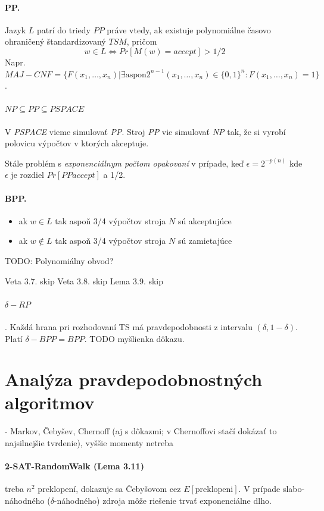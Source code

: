 \documentclass[12pt,a4paper]{article}
\begin{document}
\paragraph{PP.} Jazyk $L$ patrí do triedy $PP$ práve vtedy, ak existuje polynomiálne časovo ohraničený štandardizovaný $TS M$, pričom
$$
  w \in L \Leftrightarrow Pr[M(w) = accept] > 1/2
$$
Napr. $MAJ-CNF = \{F(x_1, \ldots, x_n) | \exists \mbox{aspon} 2^{n-1} (x_1,\ldots,x_n) \in \{0,1\}^n : F(x_1, \ldots, x_n) = 1\}$. 

\paragraph{$NP \subseteq PP \subseteq PSPACE$} V \emph{PSPACE} vieme simulovať \emph{PP}. Stroj \emph{PP} vie simulovať \emph{NP} tak, že si vyrobí polovicu výpočtov v ktorých akceptuje. 

Stále problém s \emph{exponenciálnym počtom opakovaní} v prípade, keď $\epsilon = 2^{-p(n)}$ kde $\epsilon$ je rozdiel $Pr[PP accept]$ a 1/2. 

\paragraph{BPP.} 
\begin{itemize} 
  \item ak $w \in L$ tak aspoň 3/4 výpočtov stroja $N$ sú akceptujúce 
  \item ak $w \not\in L$ tak aspoň 3/4 výpočtov stroja $N$ sú zamietajúce 
\end{itemize} 
TODO: Polynomiálny obvod? 

Veta 3.7. skip
Veta 3.8. skip 
Lema 3.9. skip  

\paragraph{$\delta-RP$}. Každá hrana pri rozhodovaní TS má pravdepodobnosti z intervalu $(\delta, 1-\delta)$. Platí $\delta-BPP = BPP$. TODO myšlienka dôkazu. 

\section{Analýza pravdepodobnostných algoritmov}
 - Markov, Čebyšev, Chernoff (aj s dôkazmi; v Chernoffovi stačí dokázať to najsilnejšie tvrdenie), vyššie momenty netreba
 
\paragraph{2-SAT-RandomWalk (Lema 3.11)} treba $n^2$ preklopení, dokazuje sa Čebyšovom cez $E[\mbox{preklopeni}]$. V prípade slabo-náhodného ($\delta$-náhodného) zdroja môže riešenie trvať exponenciálne dlho. 
 
\end{document}
